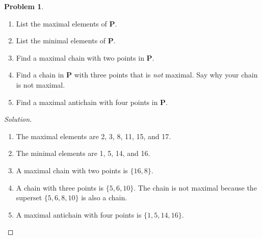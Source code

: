 \documentclass[12pt]{article}
\newcounter{chapternumber}
\theoremstyle{definition}
\newtheorem{problem-internal}{Problem}[chapternumber]
\newenvironment{problem}{
  \medskip
  \begin{problem-internal}
}{
\end{problem-internal}
}
\newenvironment{solution}{
  \begin{proof}[Solution]
    \vspace{-8px}
    \setlength{\parskip}{4px}
    \setlength{\parindent}{0px}
}{
\end{proof}
}
\begin{document}
\begin{problem}
\begin{figure}[H]
\begin{tikzpicture}
      \end{tikzpicture}

    \end{figure}

    \begin{enumerate}[label={\alph*.}]
      \item List the maximal elements of \textbf{P}.
      \item List the minimal elements of \textbf{P}.
      \item Find a maximal chain with two points in \textbf{P}.
      \item Find a chain in \textbf{P} with three points that is \textit{not} maximal. Say why your chain is not maximal.
      \item Find a maximal antichain with four points in \textbf{P}.
    \end{enumerate}
  \end{problem}

  \begin{solution}
    \hfill
    \begin{enumerate}[label={\alph*.}]
      \item The maximal elements are 2, 3, 8, 11, 15, and 17.
      \item The minimal elements are 1, 5, 14, and 16.
      \item A maximal chain with two points is \(\{16, 8\}\).
      \item A chain with three points is \(\{5, 6, 10\}\). The chain is not maximal because the superset \(\{5, 6, 8, 10\}\) is also a chain.
      \item A maximal antichain with four points is \(\{1, 5, 14, 16\}\).
    \end{enumerate}
  \end{solution}
\end{document}
